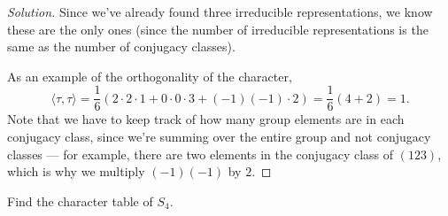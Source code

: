 \begin{proof}[Solution]
Since we've already found three irreducible representations, we know these are the only ones (since the number of irreducible representations is the same as the number of conjugacy classes). 

As an example of the orthogonality of the character, \[\langle \tau, \tau \rangle = \frac{1}{6}(2 \cdot 2\cdot 1 + 0\cdot 0 \cdot 3 + (-1)(-1)\cdot 2) = \frac{1}{6}(4 + 2) = 1.\]  Note that we have to keep track of how many group elements are in each conjugacy class, since we're summing over the entire group and not conjugacy classes --- for example, there are two elements in the conjugacy class of $(123)$, which is why we multiply $(-1)(-1)$ by $2$. 
\end{proof}

\begin{example}
Find the character table of $S_4$. 
\end{example}

